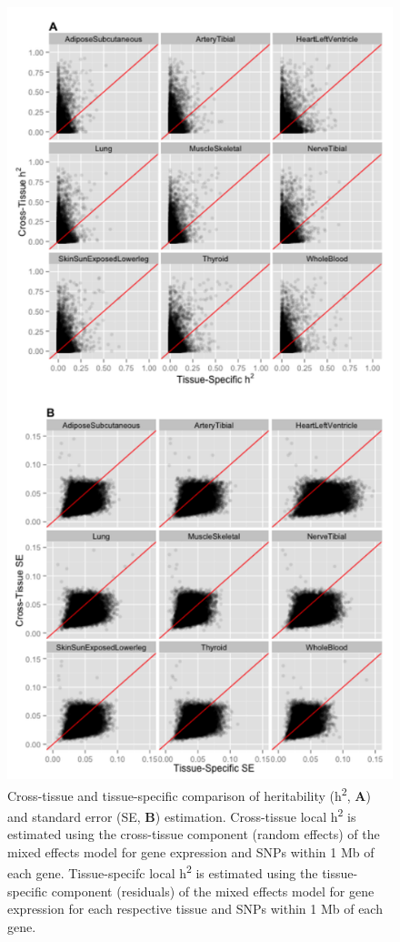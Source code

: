 \documentclass[]{article}
\begin{document}
\begin{figure}[htbp]
\centering
\includegraphics{GenArch_manuscript_files/figure-latex/TSotdH2SE-1.pdf}
\caption{Cross-tissue and tissue-specific comparison of heritability
(h\textsuperscript{2}, \textbf{A}) and standard error (SE, \textbf{B})
estimation. Cross-tissue local h\textsuperscript{2} is estimated using
the cross-tissue component (random effects) of the mixed effects model
for gene expression and SNPs within 1 Mb of each gene. Tissue-specifc
local h\textsuperscript{2} is estimated using the tissue-specific
component (residuals) of the mixed effects model for gene expression for
each respective tissue and SNPs within 1 Mb of each gene.}
\end{figure}
\end{document}
